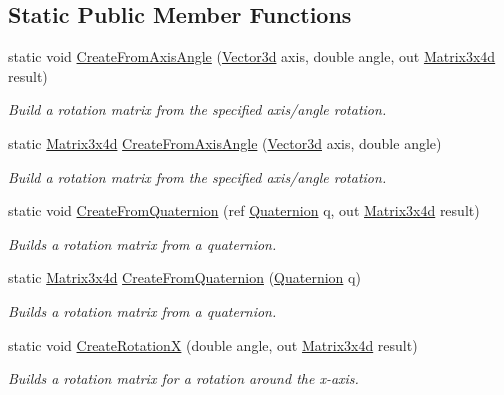 \subsection*{Static Public Member Functions}
\begin{DoxyCompactItemize}
\item 
static void \hyperlink{struct_open_t_k_1_1_matrix3x4d_ab67a2328c3ee2be67fc10f9777d396d9}{Create\-From\-Axis\-Angle} (\hyperlink{struct_open_t_k_1_1_vector3d}{Vector3d} axis, double angle, out \hyperlink{struct_open_t_k_1_1_matrix3x4d}{Matrix3x4d} result)
\begin{DoxyCompactList}\small\item\em Build a rotation matrix from the specified axis/angle rotation. \end{DoxyCompactList}\item 
static \hyperlink{struct_open_t_k_1_1_matrix3x4d}{Matrix3x4d} \hyperlink{struct_open_t_k_1_1_matrix3x4d_a41a785452926e306798d9478c34f49e0}{Create\-From\-Axis\-Angle} (\hyperlink{struct_open_t_k_1_1_vector3d}{Vector3d} axis, double angle)
\begin{DoxyCompactList}\small\item\em Build a rotation matrix from the specified axis/angle rotation. \end{DoxyCompactList}\item 
static void \hyperlink{struct_open_t_k_1_1_matrix3x4d_aa92a520712d7c6a4c92d811d56cf18b4}{Create\-From\-Quaternion} (ref \hyperlink{struct_open_t_k_1_1_quaternion}{Quaternion} q, out \hyperlink{struct_open_t_k_1_1_matrix3x4d}{Matrix3x4d} result)
\begin{DoxyCompactList}\small\item\em Builds a rotation matrix from a quaternion. \end{DoxyCompactList}\item 
static \hyperlink{struct_open_t_k_1_1_matrix3x4d}{Matrix3x4d} \hyperlink{struct_open_t_k_1_1_matrix3x4d_ad481506d7f51e9ed280940d08a6b088f}{Create\-From\-Quaternion} (\hyperlink{struct_open_t_k_1_1_quaternion}{Quaternion} q)
\begin{DoxyCompactList}\small\item\em Builds a rotation matrix from a quaternion. \end{DoxyCompactList}\item 
static void \hyperlink{struct_open_t_k_1_1_matrix3x4d_a6af5a6f81a7008a557eb51e30497e5a0}{Create\-Rotation\-X} (double angle, out \hyperlink{struct_open_t_k_1_1_matrix3x4d}{Matrix3x4d} result)
\begin{DoxyCompactList}\small\item\em Builds a rotation matrix for a rotation around the x-\/axis. \end{DoxyCompactList}\item 

\end{DoxyCompactItemize}
